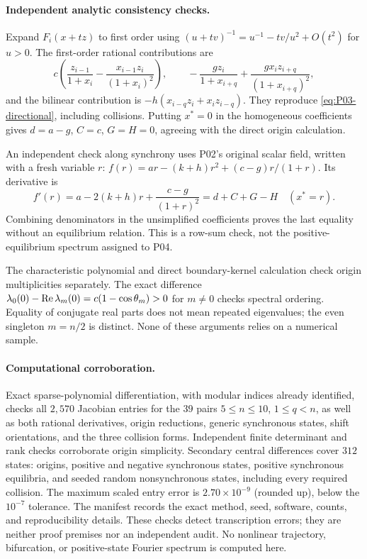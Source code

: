 \paragraph{Independent analytic consistency checks.}
Expand $F_i(x+t z)$ to first order using
$(u+t v)^{-1}=u^{-1}-t v/u^2+O(t^2)$ for $u>0$.
The first-order rational contributions are
\[
 c\left(\frac{z_{i-1}}{1+x_i}
      -\frac{x_{i-1}z_i}{(1+x_i)^2}\right),\qquad
 -\frac{g z_i}{1+x_{i+q}}+\frac{g x_i z_{i+q}}{(1+x_{i+q})^2},
\]
and the bilinear contribution is
$-h(x_{i-q}z_i+x_i z_{i-q})$. They reproduce
\eqref{eq:P03-directional}, including collisions. Putting $x^*=0$
in the homogeneous coefficients gives $d=a-g$, $C=c$, $G=H=0$,
agreeing with the direct origin calculation.

An independent check along synchrony uses P02's original scalar
field, written with a fresh variable $r$:
$f(r)=ar-(k+h)r^2+(c-g)r/(1+r)$. Its derivative is
\begin{equation}
 f'(r)=a-2(k+h)r+\frac{c-g}{(1+r)^2}
       =d+C+G-H\quad(x^*=r).
 \label{eq:P03-row-sum-check}
\end{equation}
Combining denominators in the unsimplified coefficients proves the
last equality without an equilibrium relation. This is a row-sum
check, not the positive-equilibrium spectrum assigned to P04.

The characteristic polynomial and direct boundary-kernel calculation
check origin multiplicities separately. The exact difference
$\lambda_0(0)-\operatorname{Re}\lambda_m(0)=c(1-\cos\theta_m)>0$ for $m\ne0$
checks spectral ordering. Equality of conjugate real parts does not
mean repeated eigenvalues; the even singleton $m=n/2$ is distinct.
None of these arguments relies on a numerical sample.

\paragraph{Computational corroboration.}
Exact sparse-polynomial differentiation, with modular indices already
identified, checks all $2{,}570$ Jacobian entries for the $39$ pairs
$5\le n\le10$, $1\le q<n$, as well as both rational derivatives,
origin reductions, generic synchronous states, shift orientations,
and the three collision forms. Independent finite determinant and
rank checks corroborate origin simplicity. Secondary central
differences cover $312$ states: origins, positive and negative
synchronous states, positive synchronous equilibria, and seeded
random nonsynchronous states, including every required collision.
The maximum scaled entry error is $2.70\times10^{-9}$ (rounded up),
below the $10^{-7}$ tolerance. The manifest records the exact method,
seed, software, counts, and reproducibility details. These checks
detect transcription errors; they are neither proof premises nor
an independent audit. No nonlinear trajectory, bifurcation, or
positive-state Fourier spectrum is computed here.

